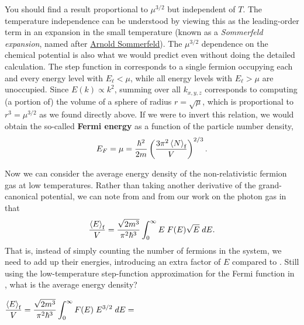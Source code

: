 You should find a result proportional to $\mu^{3 / 2}$ but independent of $T$.
The temperature independence can be understood by viewing this as the leading-order term in an expansion in the small temperature (known as a \textit{Sommerfeld expansion}, named after \href{https://en.wikipedia.org/wiki/Arnold_Sommerfeld}{Arnold Sommerfeld}).
The $\mu^{3 / 2}$ dependence on the chemical potential is also what we would predict even without doing the detailed calculation.
The step function in  corresponds to a single fermion occupying each and every energy level with $E_{\ell} < \mu$, while all energy levels with $E_{\ell} > \mu$ are unoccupied.
Since $E(k) \propto k^2$, summing over all $k_{x, y, z}$ corresponds to computing (a portion of) the volume of a sphere of radius $r = \sqrt{\mu}$, which is proportional to $r^3 = \mu^{3 / 2}$ as we found directly above.
If we were to invert this relation, we would obtain the so-called \textbf{Fermi energy} as a function of the particle number density,
\begin{equation}
  \label{eq:Fermi_energy}
  E_F = \mu = \frac{\hbar^2}{2m}\left(\frac{3\pi^2 \left\langle N \right\rangle_{\text{f}}}{V}\right)^{2 / 3}.
\end{equation}

Now we can consider the average energy density of the non-relativistic fermion gas at low temperatures.
Rather than taking another derivative of the grand-canonical potential, we can note from  and from our work on the photon gas in  that
\begin{equation}
  \frac{\left\langle E \right\rangle_{\text{f}}}{V} = \frac{\sqrt{2m^3}}{\pi^2 \hbar^3} \int_0^{\infty} E \; F(E) \sqrt{E} \; dE.
\end{equation}
That is, instead of simply counting the number of fermions in the system, we need to add up their energies, introducing an extra factor of $E$ compared to .
Still using the low-temperature step-function approximation for the Fermi function in , what is the average energy density?
\begin{mdframed}
  $\displaystyle \frac{\left\langle E \right\rangle_{\text{f}}}{V} = \frac{\sqrt{2m^3}}{\pi^2 \hbar^3} \int_0^{\infty} F(E) \; E^{3 / 2} \; dE = $ \\[100 pt]
\end{mdframed}

